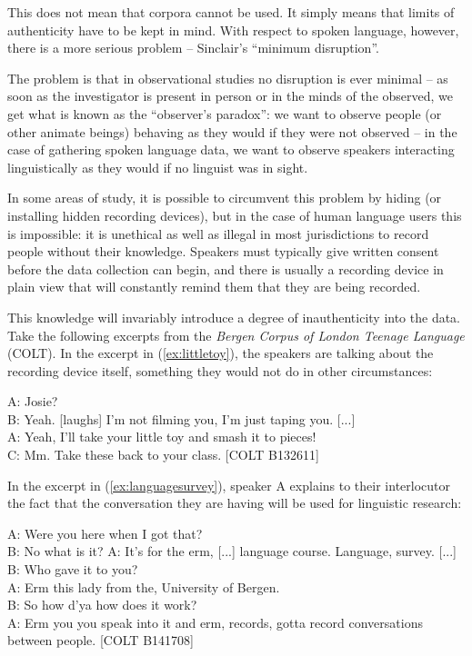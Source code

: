 This does not mean that corpora cannot be used. It simply means that limits of authenticity  have to be kept in mind. With respect to spoken  language, however, there is a more serious problem -- Sinclair's ``minimum disruption''.

The problem is that in observational  studies no disruption is ever minimal -- as soon as the investigator is present in person or in the minds of the observed, we get what is known as the ``observer's paradox'': we want to observe people (or other animate beings) behaving as they would if they were not observed -- in the case of gathering spoken  language data, we want to observe speakers interacting linguistically as they would if no linguist was in sight.

In some areas of study, it is possible to circumvent this problem by hiding (or installing hidden recording devices), but in the case of human language users this is impossible: it is unethical as well as illegal in most jurisdictions to record people without their knowledge. Speakers must typically give written consent before the data collection can begin, and there is usually a recording device in plain view that will constantly remind them that they are being recorded.

This knowledge will invariably introduce a degree of inauthenticity into the data. Take the following excerpts from the \emph{Bergen Corpus of London Teenage Language} (COLT). In the excerpt in (\ref{ex:littletoy}), the speakers are talking about the recording device itself, something they would not do in other circumstances:\pagebreak

\begin{exe}
\ex
\label{ex:littletoy}
A: Josie? \\
B: Yeah. [laughs] I'm not filming you, I'm just taping you. [...] \\
A: Yeah, I'll take your little toy and smash it to pieces! \\
C: Mm. Take these back to your class. [COLT B132611]
\end{exe}

In the excerpt in (\ref{ex:languagesurvey}), speaker A explains to their interlocutor the fact that the conversation  they are having will be used for linguistic research:

\begin{exe}
\ex
\label{ex:languagesurvey}
A: Were you here when I got that? \\
B: No what is it? A: It's for the erm, [...] language course. Language, survey. [...] \\
B: Who gave it to you? \\
A: Erm this lady from the, University of Bergen. \\
B: So how d'ya how does it work? \\
A: Erm you you speak into it and erm, records, gotta record conversations between people. [COLT B141708]
\end{exe}

